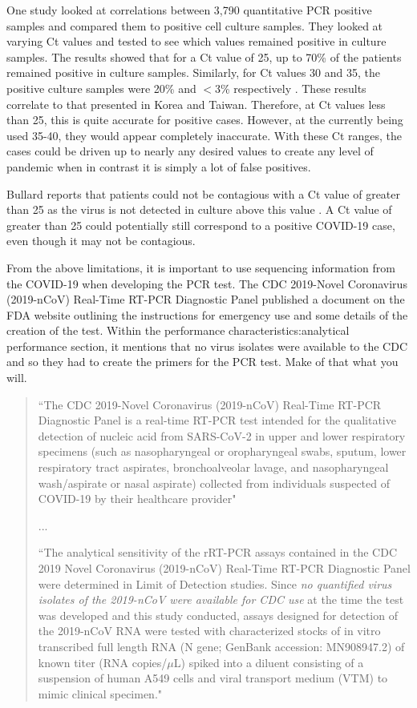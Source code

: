 \documentclass[10pt, a4paper, twocolumn]{book}
\begin{document}
One study looked at correlations between 3,790 quantitative PCR positive samples and compared them to positive cell culture samples. They looked at varying Ct values and tested to see which values remained positive in culture samples. The results showed that for a Ct value of 25, up to 70\% of the patients remained positive in culture samples. Similarly, for Ct values 30 and 35, the positive culture samples were 20\% and $<$3\% respectively \citep{PCRvsCellCultures}. These results correlate to that presented in Korea and Taiwan. Therefore, at Ct values less than 25, this is quite accurate for positive cases. However, at the currently being used 35-40, they would appear completely inaccurate. With these Ct ranges, the cases could be driven up to nearly any desired values to create any level of pandemic when in contrast it is simply a lot of false positives. 

Bullard reports that patients could not be contagious with a Ct value of greater than 25 as the virus is not detected in culture above this value \citep{CtNotContagious}. A Ct value of greater than 25 could potentially still correspond to a positive COVID-19 case, even though it may not be contagious.

From the above limitations, it is important to use sequencing information from the COVID-19 when developing the PCR test. The CDC 2019-Novel Coronavirus (2019-nCoV) Real-Time RT-PCR Diagnostic Panel published a document on the FDA website outlining the instructions for emergency use and some details of the creation of the test. Within the performance characteristics:analytical performance section, it mentions that no virus isolates were available to the CDC and so they had to create the primers for the PCR test. Make of that what you will.

\begin{quotation}
	``The CDC 2019-Novel Coronavirus (2019-nCoV) Real-Time RT-PCR Diagnostic Panel is a real-time RT-PCR test intended for the qualitative detection of nucleic acid from SARS-CoV-2 in upper and lower respiratory specimens (such as nasopharyngeal or oropharyngeal swabs, sputum, lower respiratory tract aspirates, bronchoalveolar lavage, and nasopharyngeal wash/aspirate or nasal aspirate) collected from individuals suspected of COVID-19 by their healthcare provider"
	
	...
	
	``The analytical sensitivity of the rRT-PCR assays contained in the CDC 2019 Novel Coronavirus (2019-nCoV) Real-Time RT-PCR Diagnostic Panel were determined in Limit of Detection studies. Since \textit{no quantified virus isolates of the 2019-nCoV were available for CDC use} at the time the test was developed and this study conducted, assays designed for detection of the 2019-nCoV RNA were tested with characterized stocks of in vitro transcribed full length RNA (N gene; GenBank accession: MN908947.2) of known titer (RNA copies/$\mu$L) spiked into a diluent consisting of a suspension of human A549 cells and viral transport medium (VTM) to mimic clinical specimen." \citep{PCRDiagnosticPanel}
\end{quotation}
\end{document}
